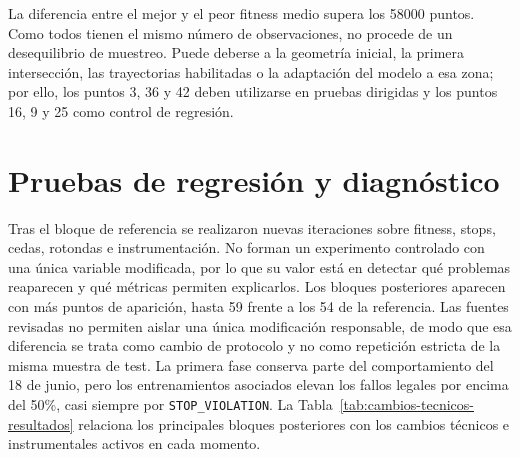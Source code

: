 La diferencia entre el mejor y el peor fitness medio supera los 58000 puntos. Como todos tienen el mismo número de observaciones, no procede de un desequilibrio de muestreo. Puede deberse a la geometría inicial, la primera intersección, las trayectorias habilitadas o la adaptación del modelo a esa zona; por ello, los puntos 3, 36 y 42 deben utilizarse en pruebas dirigidas y los puntos 16, 9 y 25 como control de regresión.

\section{Pruebas de regresión y diagnóstico}

Tras el bloque de referencia se realizaron nuevas iteraciones sobre fitness, stops, cedas, rotondas e instrumentación. No forman un experimento controlado con una única variable modificada, por lo que su valor está en detectar qué problemas reaparecen y qué métricas permiten explicarlos. Los bloques posteriores aparecen con más puntos de aparición, hasta 59 frente a los 54 de la referencia. Las fuentes revisadas no permiten aislar una única modificación responsable, de modo que esa diferencia se trata como cambio de protocolo y no como repetición estricta de la misma muestra de test. La primera fase conserva parte del comportamiento del 18 de junio, pero los entrenamientos asociados elevan los fallos legales por encima del 50\%, casi siempre por \texttt{STOP\_VIOLATION}. La Tabla~\ref{tab:cambios-tecnicos-resultados} relaciona los principales bloques posteriores con los cambios técnicos e instrumentales activos en cada momento.

